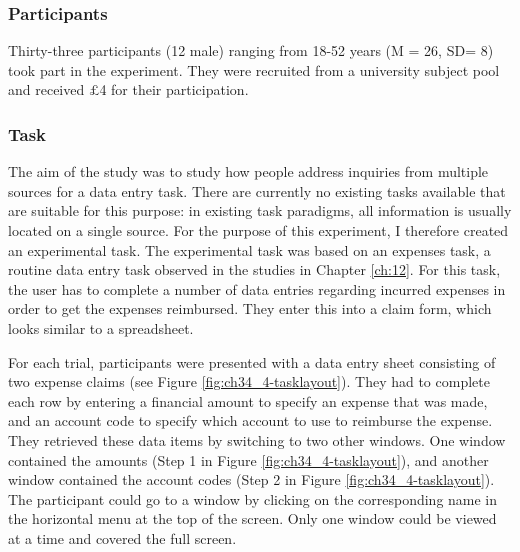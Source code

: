 \subsubsection{Participants}
Thirty-three participants (12 male) ranging from 18-52 years (M = 26, SD= 8) took part in the experiment. They were recruited from a university subject pool and received $\pounds$4 for their participation.

\subsubsection{Task}
The aim of the study was to study how people address inquiries from multiple sources for a data entry task. There are currently no existing tasks available that are suitable for this purpose: in existing task paradigms, all information is usually located on a single source. For the purpose of this experiment, I therefore created an experimental task. The experimental task was based on an expenses task, a routine data entry task observed in the studies in Chapter \ref{ch:12}. For this task, the user has to complete a number of data entries regarding incurred expenses in order to get the expenses reimbursed. They enter this into a claim form, which looks similar to a spreadsheet. 

For each trial, participants were presented with a data entry sheet consisting of two expense claims (see Figure \ref{fig:ch34_4-tasklayout}). They had to complete each row by entering a financial amount to specify an expense that was made, and an account code to specify which account to use to reimburse the expense. They retrieved these data items by switching to two other windows. One window contained the amounts (Step 1 in Figure \ref{fig:ch34_4-tasklayout}), and another window contained the account codes (Step 2 in Figure \ref{fig:ch34_4-tasklayout}). The participant could go to a window by clicking on the corresponding name in the horizontal menu at the top of the screen. Only one window could be viewed at a time and covered the full screen. 


